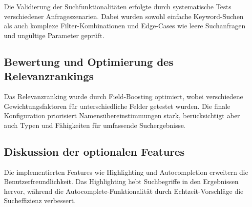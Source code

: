 Die Validierung der Suchfunktionalitäten erfolgte durch systematische Tests verschiedener Anfrageszenarien. Dabei wurden sowohl einfache Keyword-Suchen als auch komplexe Filter-Kombinationen und Edge-Cases wie leere Suchanfragen und ungültige Parameter geprüft.

\subsection{Bewertung und Optimierung des Relevanzrankings}

Das Relevanzranking wurde durch Field-Boosting optimiert, wobei verschiedene Gewichtungsfaktoren für unterschiedliche Felder getestet wurden. Die finale Konfiguration priorisiert Namensübereinstimmungen stark, berücksichtigt aber auch Typen und Fähigkeiten für umfassende Suchergebnisse.

\subsection{Diskussion der optionalen Features}

Die implementierten Features wie Highlighting und Autocompletion erweitern die Benutzerfreundlichkeit. Das Highlighting hebt Suchbegriffe in den Ergebnissen hervor, während die Autocomplete-Funktionalität durch Echtzeit-Vorschläge die Sucheffizienz verbessert.